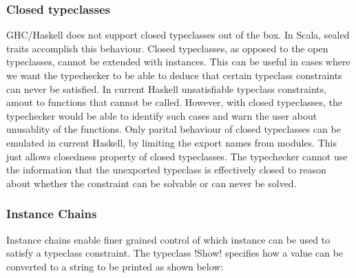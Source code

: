\documentclass[manuscript,screen,nonacm]{acmart}
\begin{document}
\subsubsection{Closed typeclasses}
GHC/Haskell does not support closed typeclasses out of the box. In Scala, sealed traits accomplish this behaviour. Closed typeclasses, as opposed to the open typeclasses, cannot be extended with instances. This can be useful in cases where we want the typechecker to be able to deduce that certain typeclass constraints can never be satisfied. In current Haskell unsatisfiable typeclass constraints, amout to functions that cannot be called. However, with closed typeclasses, the typechecker would be able to identify such cases and warn the user about unusablity of the functions. Only parital behaviour of closed typeclasses can be emulated in current Haskell, by limiting the export names from modules. This just allows closedness property of closed typeclasses. The typechecker cannot use the information that the unexported typeclass is effectively closed to reason about whether the constraint can be solvable or can never be solved.


\subsubsection{Instance Chains}
Instance chains\cite{morris_instance_2010} enable finer grained control of which instance can be used to satisfy a typeclass constraint. The typeclass !Show! specifies how a value can be converted to a string to be printed as shown below:
\end{document}
